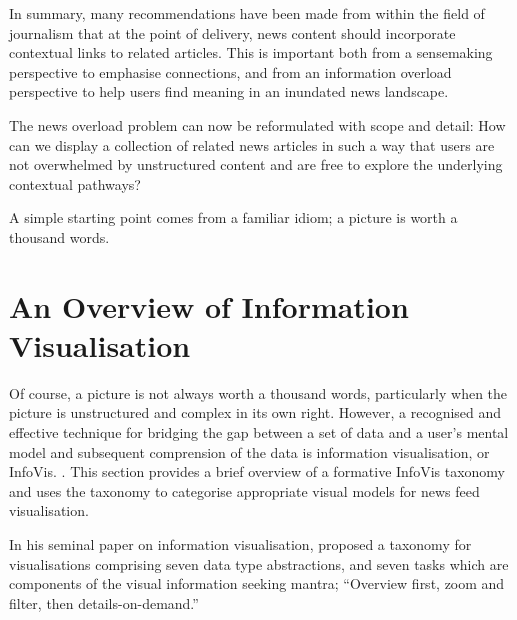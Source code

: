 In summary, many recommendations have been made from within the field of journalism that at the point of delivery, news content should incorporate contextual links to related articles. This is important both from a sensemaking perspective to emphasise connections, and from an information overload perspective to help users find meaning in an inundated news landscape.

The news overload problem can now be reformulated with scope and detail: How can we display a collection of related news articles in such a way that users are not overwhelmed by unstructured content and are free to explore the underlying contextual pathways?

A simple starting point comes from a familiar idiom; a picture is worth a thousand words.

\section{An Overview of Information Visualisation}

Of course, a picture is not always worth a thousand words, particularly when the picture is unstructured and complex in its own right. However, a recognised and effective technique for bridging the gap between a set of data and a user's mental model and subsequent comprension of the data is information visualisation, or InfoVis. \citep{UnderstandingAndCharacterizingInsights, ThemeRiver}. This section provides a brief overview of a formative InfoVis taxonomy and uses the taxonomy to categorise appropriate visual models for news feed visualisation.

In his seminal paper on information visualisation, \citeauthor{TheEyesHaveIt} proposed a taxonomy for visualisations comprising seven data type abstractions, and seven tasks which are components of the visual information seeking mantra; ``Overview first, zoom and filter, then details-on-demand.'' \citep[p.1]{TheEyesHaveIt}

